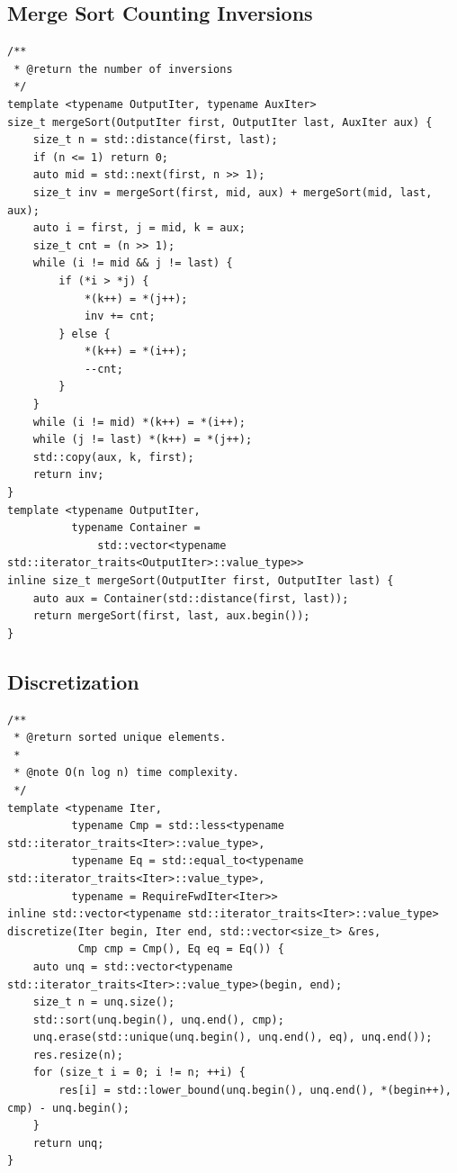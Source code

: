 \documentclass[UTF8]{article}
\begin{document}
\subsection{Merge Sort Counting Inversions}
\begin{verbatim}
/**
 * @return the number of inversions
 */
template <typename OutputIter, typename AuxIter>
size_t mergeSort(OutputIter first, OutputIter last, AuxIter aux) {
	size_t n = std::distance(first, last);
	if (n <= 1) return 0;
	auto mid = std::next(first, n >> 1);
	size_t inv = mergeSort(first, mid, aux) + mergeSort(mid, last, aux);
	auto i = first, j = mid, k = aux;
	size_t cnt = (n >> 1);
	while (i != mid && j != last) {
		if (*i > *j) {
			*(k++) = *(j++);
			inv += cnt;
		} else {
			*(k++) = *(i++);
			--cnt;
		}
	}
	while (i != mid) *(k++) = *(i++);
	while (j != last) *(k++) = *(j++);
	std::copy(aux, k, first);
	return inv;
}
template <typename OutputIter,
		  typename Container =
			  std::vector<typename std::iterator_traits<OutputIter>::value_type>>
inline size_t mergeSort(OutputIter first, OutputIter last) {
	auto aux = Container(std::distance(first, last));
	return mergeSort(first, last, aux.begin());
}
\end{verbatim}

\subsection{Discretization}
\begin{verbatim}
/**
 * @return sorted unique elements.
 *
 * @note O(n log n) time complexity.
 */
template <typename Iter,
		  typename Cmp = std::less<typename std::iterator_traits<Iter>::value_type>,
		  typename Eq = std::equal_to<typename std::iterator_traits<Iter>::value_type>,
		  typename = RequireFwdIter<Iter>>
inline std::vector<typename std::iterator_traits<Iter>::value_type>
discretize(Iter begin, Iter end, std::vector<size_t> &res,
		   Cmp cmp = Cmp(), Eq eq = Eq()) {
	auto unq = std::vector<typename std::iterator_traits<Iter>::value_type>(begin, end);
	size_t n = unq.size();
	std::sort(unq.begin(), unq.end(), cmp);
	unq.erase(std::unique(unq.begin(), unq.end(), eq), unq.end());
	res.resize(n);
	for (size_t i = 0; i != n; ++i) {
		res[i] = std::lower_bound(unq.begin(), unq.end(), *(begin++), cmp) - unq.begin();
	}
	return unq;
}
\end{verbatim}
\end{document}
